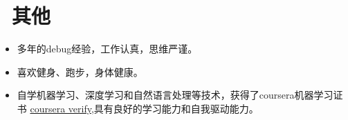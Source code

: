 \documentclass{resume}
\begin{document}



\section{\faInfo\ 其他}\normalsize
\begin{itemize}
\item {多年的debug经验，工作认真，思维严谨。}
\item {喜欢健身、跑步，身体健康。}
\item {自学机器学习、深度学习和自然语言处理等技术，获得了coursera机器学习证书} \href{https://www.coursera.org/account/accomplishments/verify/NFCZEBTZ5T4L}{coursera verify}{,具有良好的学习能力和自我驱动能力。}
\end{itemize}

%
%
\end{document}
